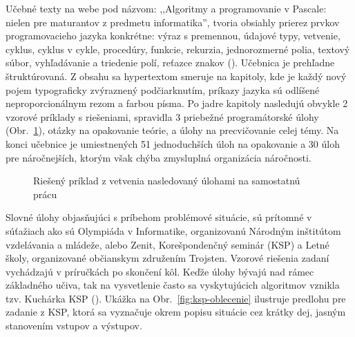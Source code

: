 Učebné texty na webe pod názvom: ,,Algoritmy a programovanie v Pascale: nielen pre maturantov z predmetu informatika'', tvoria obsiahly prierez prvkov programovacieho jazyka konkrétne: výraz s premennou, údajové typy, vetvenie, cyklus, cyklus v cykle, procedúry, funkcie, rekurzia, jednorozmerné polia, textový súbor, vyhľadávanie a triedenie polí, reťazce znakov (\cite{hedvigova_algoritmy_2007}). Učebnica je prehľadne štruktúrovaná. Z obsahu sa hypertextom smeruje na kapitoly, kde je každý nový pojem typograficky zvýraznený podčiarknutím, príkazy jazyka sú odlíšené neproporcionálnym rezom a farbou písma. Po jadre kapitoly nasledujú obvykle 2 vzorové príklady s riešeniami, spravidla 3 priebežné programátorské úlohy (Obr.~\ref{fig:uloha-pascal}), otázky na opakovanie teórie, a úlohy na precvičovanie celej témy. Na konci učebnice je umiestnených 51 jednoduchších úloh na opakovanie a 30 úloh pre náročnejších, ktorým však chýba zmysluplná organizácia náročnosti.

\begin{figure}[h]
\centering
{}
\caption{Riešený príklad z vetvenia nasledovaný úlohami na samostatnú prácu}
\label{fig:uloha-pascal}
\end{figure}

Slovné úlohy objasňujúci s príbehom  problémové situácie, sú prítomné v súťažiach ako sú Olympiáda v Informatike, organizovanú Národným inštitútom vzdelávania a mládeže, alebo Zenit, Korešpondenčný seminár (KSP) a Letné školy, organizované občianskym združením Trojsten. Vzorové riešenia zadaní vychádzajú v príručkách po skončení kôl. Keďže úlohy bývajú nad rámec základného učiva, tak na vysvetlenie často sa vyskytujúcich algoritmov vznikla tzv. Kuchárka KSP (\cite{noauthor_kucharka_2022}). Ukážka na Obr.~\ref{fig:ksp-oblecenie} ilustruje predlohu pre zadanie z KSP, ktorá sa vyznačuje okrem popisu situácie cez krátky dej, jasným stanovením vstupov a výstupov. 


